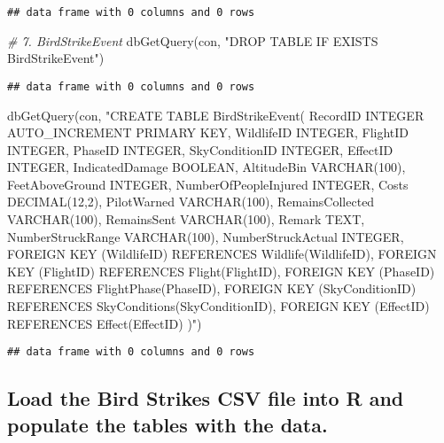 \documentclass[
]{article}
\newenvironment{Shaded}{\begin{snugshade}}{\end{snugshade}}
\newcommand{\CommentTok}[1]{\textcolor[rgb]{0.56,0.35,0.01}{\textit{#1}}}
\newcommand{\FunctionTok}[1]{\textcolor[rgb]{0.00,0.00,0.00}{#1}}
\newcommand{\NormalTok}[1]{#1}
\newcommand{\StringTok}[1]{\textcolor[rgb]{0.31,0.60,0.02}{#1}}
\begin{document}
\begin{verbatim}
## data frame with 0 columns and 0 rows
\end{verbatim}

\begin{Shaded}
\begin{Highlighting}[]
\CommentTok{\# 7. BirdStrikeEvent}
\FunctionTok{dbGetQuery}\NormalTok{(con, }\StringTok{"DROP TABLE IF EXISTS BirdStrikeEvent"}\NormalTok{)}
\end{Highlighting}
\end{Shaded}

\begin{verbatim}
## data frame with 0 columns and 0 rows
\end{verbatim}

\begin{Shaded}
\begin{Highlighting}[]
\FunctionTok{dbGetQuery}\NormalTok{(con, }\StringTok{"CREATE TABLE BirdStrikeEvent(}
\StringTok{    RecordID INTEGER AUTO\_INCREMENT PRIMARY KEY,}
\StringTok{    WildlifeID INTEGER,}
\StringTok{    FlightID INTEGER,}
\StringTok{    PhaseID INTEGER,}
\StringTok{    SkyConditionID INTEGER,}
\StringTok{    EffectID INTEGER,}
\StringTok{    IndicatedDamage BOOLEAN,}
\StringTok{    AltitudeBin VARCHAR(100),}
\StringTok{    FeetAboveGround INTEGER,}
\StringTok{    NumberOfPeopleInjured INTEGER,}
\StringTok{    Costs DECIMAL(12,2),}
\StringTok{    PilotWarned VARCHAR(100),}
\StringTok{    RemainsCollected VARCHAR(100),}
\StringTok{    RemainsSent VARCHAR(100),}
\StringTok{    Remark TEXT,}
\StringTok{    NumberStruckRange VARCHAR(100),}
\StringTok{    NumberStruckActual INTEGER,}
\StringTok{    FOREIGN KEY (WildlifeID) REFERENCES Wildlife(WildlifeID),}
\StringTok{    FOREIGN KEY (FlightID) REFERENCES Flight(FlightID),}
\StringTok{    FOREIGN KEY (PhaseID) REFERENCES FlightPhase(PhaseID),}
\StringTok{    FOREIGN KEY (SkyConditionID) REFERENCES SkyConditions(SkyConditionID),}
\StringTok{    FOREIGN KEY (EffectID) REFERENCES Effect(EffectID)}
\StringTok{)"}\NormalTok{)}
\end{Highlighting}
\end{Shaded}

\begin{verbatim}
## data frame with 0 columns and 0 rows
\end{verbatim}

\hypertarget{load-the-bird-strikes-csv-file-into-r-and-populate-the-tables-with-the-data.}{%
\subsection{Load the Bird Strikes CSV file into R and populate the
tables with the
data.}\label{load-the-bird-strikes-csv-file-into-r-and-populate-the-tables-with-the-data.}}
\end{document}
